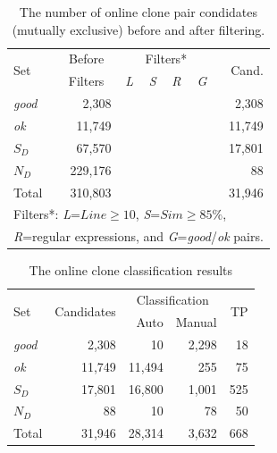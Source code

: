 \documentclass[sigconf,review, anonymous]{acmart}
\begin{document}
\begin{table}
	\centering
	\caption{The number of online clone pair condidates (mutually exclusive) before and after filtering.}
	\label{tab:online_clone_pairs}
	\small
	\begin{tabular}{l|r|c|c|c|c|r}
		\hline
		\multirow{2}{*}{Set} & \multicolumn{1}{c|}{Before} & \multicolumn{4}{c|}{Filters*} & \multirow{2}{*}{Cand.} \\ \cline{3-6}
		& \multicolumn{1}{c|}{Filters} & \textit{L} & \textit{S} & \textit{R} & \textit{G} & \\
		\hline 
		\multirow{1}{*}{\textit{good}} & 2,308 & & & & & 2,308 \\
		\multirow{1}{*}{\textit{ok}} & 11,749 & & & & & 11,749 \\
		\multirow{1}{*}{$S_D$} & 67,570 & \checkmark & & \checkmark & \checkmark & 17,801 \\
		\multirow{1}{*}{$N_D$} & 229,176 & & \checkmark & \checkmark & \checkmark & 88 \\ 
		\hline
		Total  & 310,803 & & & & & 31,946 \\ 
		\hline
		\multicolumn{7}{l}{Filters*: \textit{L}=$Line \geq 10$, \textit{S}=$Sim \geq 85\%$,} \\
		\multicolumn{7}{l}{\textit{R}=regular expressions, and \textit{G}=\textit{good}/\textit{ok} pairs.} \\
	\end{tabular} %
\end{table}

\begin{table}
	\centering
	\caption{The online clone classification results}
	\label{tab:online_clone_classification_results}
	\small
	\begin{tabular}{l|r|r|r|r}
		\hline
		\multirow{2}{*}{Set} & \multirow{2}{*}{Candidates} & \multicolumn{2}{c|}{Classification} & \multirow{2}{*}{TP} \\ \cline{3-4}
		& & Auto & Manual & \\
		\hline 
		\multirow{1}{*}{\textit{good}} & 2,308 & 10 & 2,298 & 18 \\
		\multirow{1}{*}{\textit{ok}} & 11,749 & 11,494 & 255 & 75 \\
		\multirow{1}{*}{$S_D$} & 17,801 & 16,800 & 1,001 & 525 \\
		\multirow{1}{*}{$N_D$} & 88 & 10 & 78 & 50 \\ 
		\hline
		Total  & 31,946 & 28,314 & 3,632 & 668 \\ 
		\hline
	\end{tabular} %
\end{table}
\end{document}
